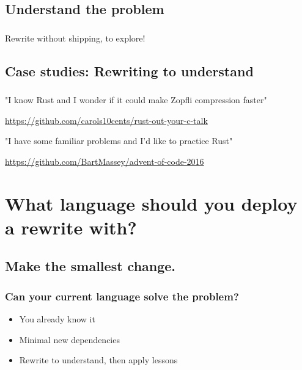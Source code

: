\documentclass{beamer}
\begin{document}
\subsection{Understand the problem}
\begin{frame}[fragile]
\frametitle{\insertsubsectionhead}
Rewrite without shipping, to explore!
\end{frame}

\subsection{Case studies: Rewriting to understand}

\begin{frame}[fragile]
\frametitle{\insertsubsectionhead}

"I know Rust and I wonder if it could make Zopfli compression faster"

\url{https://github.com/carols10cents/rust-out-your-c-talk}

"I have some familiar problems and I'd like to practice Rust"

\url{https://github.com/BartMassey/advent-of-code-2016}

\end{frame}

\section{What language should you deploy a rewrite with?}

\subsection{Make the smallest change.}

\begin{frame}[fragile]
\frametitle{Can your current language solve the problem?}
\begin{itemize}
\item You already know it
\item Minimal new dependencies
\item Rewrite to understand, then apply lessons
\end{itemize}
\end{frame}
\end{document}
